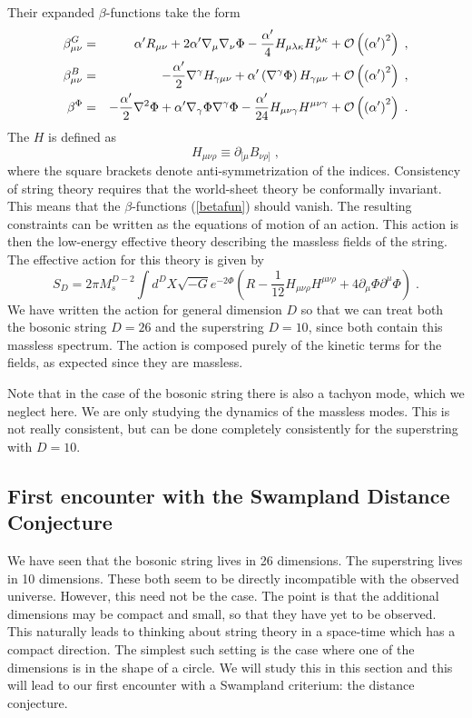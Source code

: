 \documentclass[11pt,a4paper]{article}
\numberwithin{equation}{section}
\numberwithin{table}{section}\setlength{\multlinegap}{25pt}
\newcommand{\bea}{\begin{eqnarray}}  \newcommand{\eea}{\end{eqnarray}}
\newcommand{\nn}{\nonumber}
\newcommand{\be}{\begin{equation}}
\newcommand{\ee}{\end{equation}}
\begin{document}
Their expanded $\beta$-functions take the form
\bea
\label{betafun}
\beta^G_{\mu\nu} &=& \alpha' R_{\mu\nu} + 2 \alpha' \nabla_{\mu} \nabla_{\nu} \Phi - \frac{\alpha'}{4} H_{\mu \lambda \kappa} H_{\nu}^{\lambda\kappa} + {\cal O}\left(\left(\alpha' \right)^2 \right)  \;, \nn \\
\beta^B_{\mu\nu} &=& -\frac{\alpha'}{2} \nabla^{\gamma}H_{\gamma\mu\nu} + \alpha' \left(\nabla^{\gamma}\Phi \right) H_{\gamma\mu\nu} + {\cal O}\left(\left(\alpha' \right)^2 \right)  \;, \nn \\
\beta^{\Phi} &=& -\frac{\alpha'}{2} \nabla^2 \Phi + \alpha' \nabla_{\gamma} \Phi \nabla^{\gamma} \Phi - \frac{\alpha'}{24} H_{\mu\nu\gamma}H^{\mu\nu\gamma} + {\cal O}\left(\left(\alpha' \right)^2 \right)  \;.
\eea 
The $H$ is defined as
\be
H_{\mu\nu\rho} \equiv \partial_{[\mu}B_{\nu\rho]} \;,
\ee
where the square brackets denote anti-symmetrization of the indices. 
Consistency of string theory requires that the world-sheet theory be conformally invariant. This means that the $\beta$-functions (\ref{betafun}) should vanish. The resulting constraints can be written as the equations of motion of an action. This action is then the low-energy effective theory describing the massless fields of the string. The effective action for this theory is given by
\be
S_D = 2\pi M_s^{D-2} \int d^D X \sqrt{-G} e^{-2\Phi} \left( R - \frac{1}{12} H_{\mu\nu\rho}H^{\mu\nu\rho} + 4 \partial_{\mu} \Phi \partial^{\mu} \Phi \right) \;.
\label{steff}
\ee
We have written the action for general dimension $D$ so that we can treat both the bosonic string $D=26$ and the superstring $D=10$, since both contain this massless spectrum. The action is composed purely of the kinetic terms for the fields, as expected since they are massless.

Note that in the case of the bosonic string there is also a tachyon mode, which we neglect here. We are only studying the dynamics of the massless modes. This is not really consistent, but can be done completely consistently for the superstring with $D=10$.

\subsection{First encounter with the Swampland Distance Conjecture}
\label{sec:fcsdc}


We have seen that the bosonic string lives in 26 dimensions. The superstring lives in 10 dimensions. These both seem to be directly incompatible with the observed universe. However, this need not be the case. The point is that the additional dimensions may be compact and small, so that they have yet to be observed. This naturally leads to thinking about string theory in a space-time which has a compact direction. The simplest such setting is the case where one of the dimensions is in the shape of a circle. We will study this in this section and this will lead to our first encounter with a Swampland criterium: the distance conjecture.  
\end{document}
